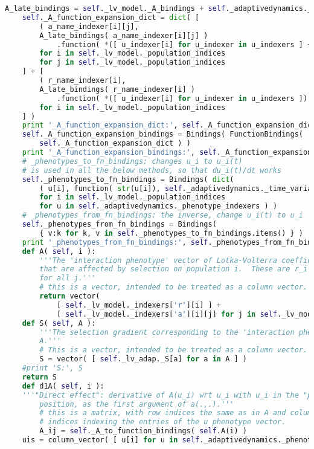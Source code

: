 \begin{lstlisting}[language=Python]
	A_late_bindings = self._lv_model._A_bindings + self._adaptivedynamics._bindings + self._adaptivedynamics._late_bindings
	self._A_function_expansion_dict = dict( [
	    ( a_name_indexer[i][j],
		A_late_bindings( a_name_indexer[i][j] )
		    .function( *([ u_indexer[i] for u_indexer in u_indexers ] + [ u_indexer[j] for u_indexer in u_indexers ]) ) )
		for i in self._lv_model._population_indices
		for j in self._lv_model._population_indices
	] + [
	    ( r_name_indexer[i],
		A_late_bindings( r_name_indexer[i] )
		    .function( *([ u_indexer[i] for u_indexer in u_indexers ]) ) )
		for i in self._lv_model._population_indices
	] )
	print '_A_function_expansion_dict:', self._A_function_expansion_dict
	self._A_function_expansion_bindings = Bindings( FunctionBindings(
	    self._A_function_expansion_dict ) )
	print '_A_function_expansion_bindings:', self._A_function_expansion_bindings
	# _phenotypes_to_fn_bindings: changes u_i to u_i(t)
	# is used in all the below methods, so that du_i(t)/dt works
	self._phenotypes_to_fn_bindings = Bindings( dict(
	    ( u[i], function( str(u[i]), self._adaptivedynamics._time_variable, latex_name=latex(u[i]) ) )
	    for i in self._lv_model._population_indices
	    for u in self._adaptivedynamics._phenotype_indexers ) )
	# _phenotypes_from_fn_bindings: the inverse, change u_i(t) to u_i
	self._phenotypes_from_fn_bindings = Bindings(
	    { v:k for k, v in self._phenotypes_to_fn_bindings.items() } )
	print '_phenotypes_from_fn_bindings:', self._phenotypes_from_fn_bindings
    def A( self, i ):
        '''The 'interaction phenotype' vector of Lotka-Volterra coefficients
        that are affected by selection on population i.  These are r_i and a_ij
        for all j.'''
        # this is a vector, intended to be treated as a column vector.
        return vector(
            [ self._lv_model._indexers['r'][i] ] +
            [ self._lv_model._indexers['a'][i][j] for j in self._lv_model._population_indices ] )
    def S( self, A ):
        '''The selection gradient corresponding to the 'interaction phenotype'
        A.'''
        # This is a vector, intended to be treated as a column vector.
        S = vector( [ self._lv_adap._S[a] for a in A ] )
	#print 'S:', S
	return S
    def d1A( self, i ):
	'''"Direct effect": derivative of A(u_i) wrt u_i with u_i in the "patient"
        position, as the first argument of a(.,.).'''
        # this is a matrix, with row indices the same as in A and column
        # indices indexing the entries of the u phenotype vector.
        A_ij = self._A_to_function_bindings( self.A(i) )
	uis = column_vector( [ u[i] for u in self._adaptivedynamics._phenotype_indexers ] )

\end{lstlisting}
